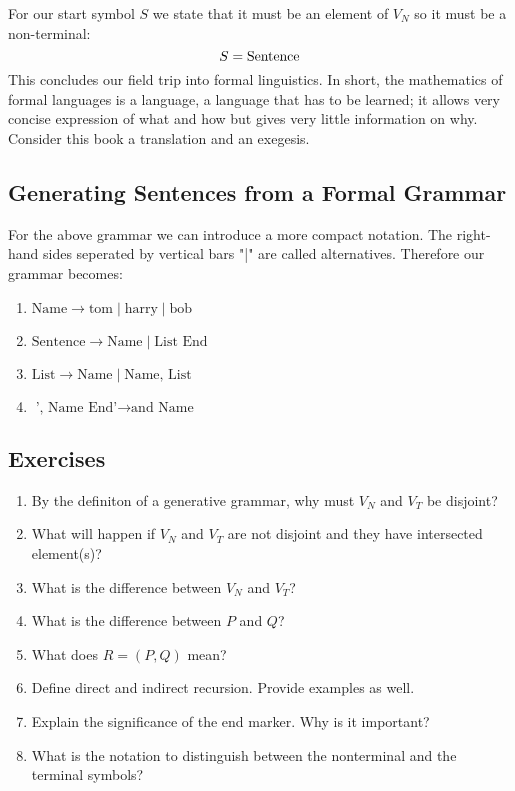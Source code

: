 For our start symbol $S$ we state that it must be an element of $V_N$ so it must be a non-terminal: 
$$S=\textnormal{Sentence}$$
This concludes our field trip into formal linguistics. In short, the mathematics of
formal languages is a language, a language that has to be learned; it allows very concise expression of what and how but gives very little information on why. Consider
this book a translation and an exegesis.

\subsection{Generating Sentences from a Formal Grammar}
For the above grammar we can introduce a more compact notation. The right-hand sides seperated by vertical bars "|" are called alternatives. 
Therefore our grammar becomes: 

\begin{enumerate}
    \item $\text{Name} \rightarrow \text{tom} \mid \text{harry} \mid \text{bob} $
    \item $\text{Sentence} \rightarrow \text{Name} \mid \text{List End} $
    \item $\text{List} \rightarrow \text{Name} \mid \text{Name, List} $
    \item $\text{', Name End'} \rightarrow \text{and Name} $
\end{enumerate}


\subsection{Exercises}

\begin{enumerate}
    \item By the definiton of a generative grammar, why must $V_N$ and $V_T$ be disjoint?
    \item What will happen if $V_N$ and $V_T$ are not disjoint and they have intersected element(s)?
    \item What is the difference between $V_N$ and $V_T$?
    \item What is the difference between $P$ and $Q$?
    \item What does $R = {(P,Q)}$ mean?
    \item Define direct and indirect recursion. Provide examples as well.
    \item Explain the significance of the end marker. Why is it important?
    \item What is the notation to distinguish between the nonterminal and the terminal symbols?
\end{enumerate}